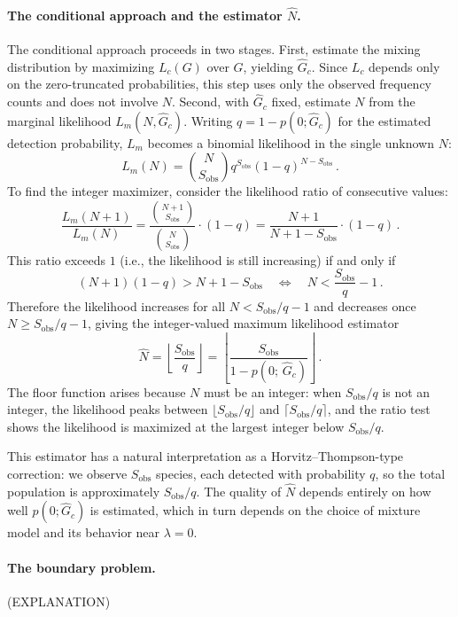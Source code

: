 \documentclass{article}
\begin{document}
{\paragraph{The conditional approach and the estimator $\hat{N}$.}
The conditional approach proceeds in two stages. First, estimate the mixing distribution by maximizing $L_c(G)$ over $G$, yielding $\hat{G}_c$. Since $L_c$ depends only on the zero-truncated probabilities, this step uses only the observed frequency counts and does not involve $N$. Second, with $\hat{G}_c$ fixed, estimate $N$ from the marginal likelihood $L_m(N, \hat{G}_c)$. Writing $q = 1 - p(0;\hat{G}_c)$ for the estimated detection probability, $L_m$ becomes a binomial likelihood in the single unknown $N$:
\[
L_m(N) = \binom{N}{S_{\mathrm{obs}}} q^{S_{\mathrm{obs}}} (1-q)^{N - S_{\mathrm{obs}}}\,.
\]
To find the integer maximizer, consider the likelihood ratio of consecutive values:
\[
\frac{L_m(N+1)}{L_m(N)} 
= \frac{\binom{N+1}{S_{\mathrm{obs}}}}{\binom{N}{S_{\mathrm{obs}}}} 
  \cdot (1-q)
= \frac{N+1}{N+1-S_{\mathrm{obs}}} \cdot (1-q)\,.
\]
This ratio exceeds $1$ (i.e., the likelihood is still increasing) if and only if
\[
(N+1)(1-q) > N + 1 - S_{\mathrm{obs}} 
\quad\Longleftrightarrow\quad 
N < \frac{S_{\mathrm{obs}}}{q} - 1\,.
\]
Therefore the likelihood increases for all $N < S_{\mathrm{obs}}/q - 1$ and decreases once $N \geq S_{\mathrm{obs}}/q - 1$, giving the integer-valued maximum likelihood estimator
\begin{equation}\label{eq:N_hat_derived}
    \hat{N} = \left\lfloor \frac{S_{\mathrm{obs}}}{q} \right\rfloor 
    = \left\lfloor \frac{S_{\mathrm{obs}}}{1 - p(0;\,\hat{G}_c)} \right\rfloor\,.
\end{equation}
The floor function arises because $N$ must be an integer: when $S_{\mathrm{obs}}/q$ is not an integer, the likelihood peaks between $\lfloor S_{\mathrm{obs}}/q \rfloor$ and $\lceil S_{\mathrm{obs}}/q \rceil$, and the ratio test shows the likelihood is maximized at the largest integer below $S_{\mathrm{obs}}/q$.

This estimator has a natural interpretation as a Horvitz--Thompson-type correction: we observe $S_{\mathrm{obs}}$ species, each detected with probability $q$, so the total population is approximately $S_{\mathrm{obs}} / q$. The quality of $\hat{N}$ depends entirely on how well $p(0;\hat{G}_c)$ is estimated, which in turn depends on the choice of mixture model and its behavior near $\lambda = 0$.

\paragraph{The boundary problem.}
(EXPLANATION)

}
\end{document}
